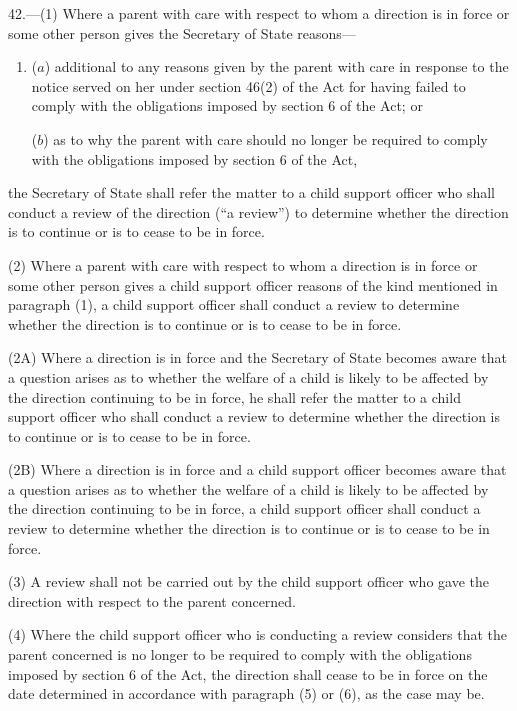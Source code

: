 \documentclass[a4paper]{article}
\begin{document}
42.—(1) Where a parent with care with respect to whom a direction is in force 
or some other person %
gives the Secretary of State reasons—
\begin{enumerate}\item[]
($a$) additional to any reasons given by 
the parent with care %
in response to the notice served on her under section 46(2) of the Act for having failed to comply with the obligations imposed by section 6 of the Act; or

($b$) as to why 
the parent with care %
should no longer be required to comply with the obligations imposed by section 6 of the Act,
\end{enumerate}
the Secretary of State shall refer the matter to a child support officer who shall conduct a review of the direction (“a review”) to determine whether the direction is to continue or is to cease to be in force.

(2) Where a parent with care with respect to whom a direction is in force 
or some other person %
gives a child support officer reasons of the kind mentioned in paragraph (1), a child support officer shall conduct a review to determine whether the direction is to continue or is to cease to be in force.

(2A) Where a direction is in force and the Secretary of State becomes aware that a question arises as to whether the welfare of a child is likely to be affected by the direction continuing to be in force, he shall refer the matter to a child support officer who shall conduct a review to determine whether the direction is to continue or is to cease to be in force.

(2B) Where a direction is in force and a child support officer becomes aware that a question arises as to whether the welfare of a child is likely to be affected by the direction continuing to be in force, a child support officer shall conduct a review to determine whether the direction is to continue or is to cease to be in force.

(3) A review shall not be carried out by the child support officer who gave the direction with respect to the parent concerned.

(4) Where the child support officer who is conducting a review considers that the parent concerned is no longer to be required to comply with the obligations imposed by section 6 of the Act, the direction shall cease to be in force on the date determined in accordance with paragraph (5) or (6), as the case may be.
\end{document}
